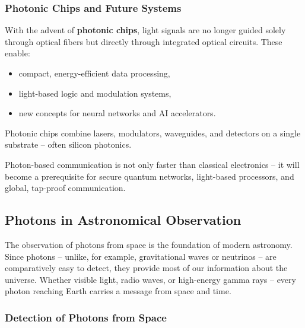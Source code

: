 \subsubsection{Photonic Chips and Future Systems}

With the advent of \textbf{photonic chips}, light signals are no longer guided solely through optical fibers but directly through integrated optical circuits. These enable:

\begin{itemize}
	\item compact, energy-efficient data processing,
	\item light-based logic and modulation systems,
	\item new concepts for neural networks and AI accelerators.
\end{itemize}

Photonic chips combine lasers, modulators, waveguides, and detectors on a single substrate – often silicon photonics.
\newpage
\noindent
\begin{tcolorbox}[hinweisbox, title=Future of Photonic Communication] 
	\label{box:Zukunft Kommunikation}
	\small
	Photon-based communication is not only faster than classical electronics – it will become a prerequisite for secure quantum networks, light-based processors, and global, tap-proof communication.
\end{tcolorbox}

\subsection{Photons in Astronomical Observation}

The observation of photons from space is the foundation of modern astronomy. Since photons – unlike, for example, gravitational waves or neutrinos – are comparatively easy to detect, they provide most of our information about the universe. Whether visible light, radio waves, or high-energy gamma rays – every photon reaching Earth carries a message from space and time.

\subsubsection{Detection of Photons from Space}

